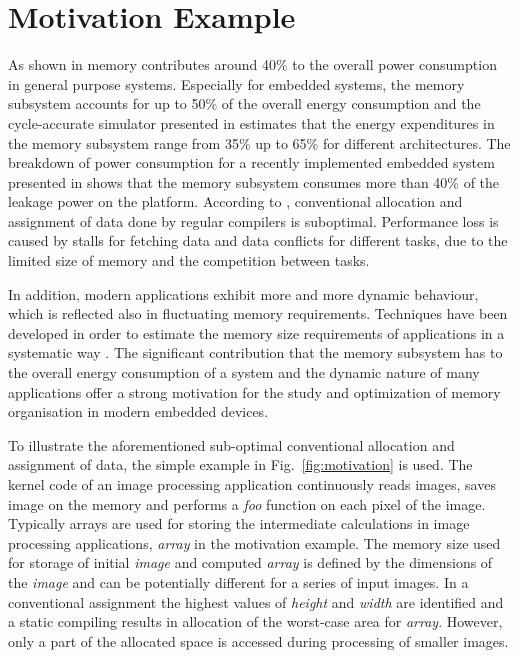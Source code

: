 \documentclass{acm_proc_article-sp}
\begin{document}
\section{Motivation Example}
\label{sec:motivation}

As shown in \cite{Gonzalez1996} memory contributes around 40\% to the overall power consumption in general purpose systems. Especially for embedded systems, the memory subsystem accounts for up to 50\% of the overall energy consumption \cite{Che09} and the cycle-accurate simulator presented in \cite{Ben99} estimates that the energy expenditures in the memory subsystem range from 35\% up to 65\% for different architectures. The breakdown of power consumption for a recently implemented embedded system presented in \cite{Hul11} shows that the memory subsystem consumes more than 40\% of the leakage power on the platform. According to \cite{tcm}, conventional allocation and assignment of data done by regular compilers is suboptimal. Performance loss is caused by stalls for fetching data and data conflicts for different tasks, due to the limited size of memory and the competition between tasks. 

In addition, modern applications exhibit more and more dynamic behaviour, which is reflected also in fluctuating memory requirements. Techniques have been developed in order to estimate the memory size requirements of applications in a systematic way \cite{Ang13}. The significant contribution that the memory subsystem has to the overall energy consumption of a system and the dynamic nature of many applications offer a strong motivation for the study and optimization of memory organisation in modern embedded devices.

To illustrate the aforementioned sub-optimal conventional allocation and assignment of data, the simple example in Fig.~\ref{fig:motivation} is used. The kernel code of an image processing application continuously reads images, saves image on the memory and performs a \textit{foo} function on each pixel of the image. Typically arrays are used for storing the intermediate calculations in image processing applications, \textit{array} in the motivation example. The memory size used for storage of initial \textit{image} and computed \textit{array} is defined by the dimensions of the \textit{image} and can be potentially different for a series of input images. In a conventional assignment the highest values of \textit{height} and \textit{width} are identified and a static compiling results in allocation of the worst-case area for \textit{array}. However, only a part of the allocated space is accessed during processing of smaller images. 
\end{document}
